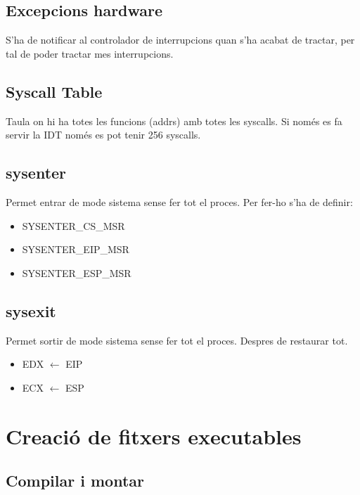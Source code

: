 \documentclass{article}
\begin{document}
    \subsection{Excepcions hardware}

        S'ha de notificar al controlador de interrupcions quan s'ha acabat de tractar, per tal de poder tractar mes interrupcions.

    \subsection{Syscall Table}

        Taula on hi ha totes les funcions (addrs) amb totes les syscalls. Si només es fa servir la IDT només es pot tenir 256 syscalls.

    \subsection{sysenter}

        Permet entrar de mode sistema sense fer tot el proces.
        Per fer-ho s'ha de definir:
        
         \begin{itemize}
            \item SYSENTER\_CS\_MSR
            \item SYSENTER\_EIP\_MSR
            \item SYSENTER\_ESP\_MSR
        \end{itemize}

    \subsection{sysexit}
        Permet sortir de mode sistema sense fer tot el proces.
        Despres de restaurar tot.
        \begin{itemize}
            \item EDX $\leftarrow$ EIP
            \item ECX $\leftarrow$ ESP
        \end{itemize}
        
    \pagebreak

    \section{Creació de fitxers executables}

    \subsection{Compilar i montar}
\end{document}
